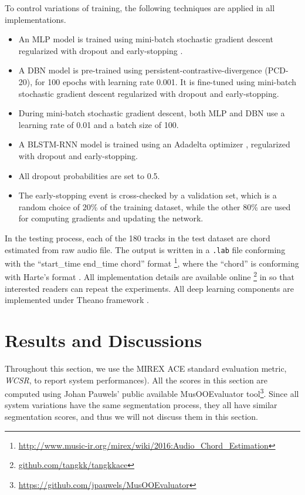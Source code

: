 To control variations of training, the following techniques are applied in all implementations. 
\begin{itemize}
\item An MLP model is trained using mini-batch stochastic gradient descent regularized with dropout \cite{srivastava2014dropout} and early-stopping \cite{prechelt1998automatic}. 
\item A DBN model is pre-trained using persistent-contrastive-divergence \cite{tieleman2008training} (PCD-20), for 100 epochs with learning rate 0.001. It is fine-tuned using mini-batch stochastic gradient descent regularized with dropout and early-stopping.
\item During mini-batch stochastic gradient descent, both MLP and DBN use a learning rate of 0.01 and a batch size of 100. 
\item A BLSTM-RNN model is trained using an Adadelta optimizer \cite{zeiler2012adadelta}, regularized with dropout and early-stopping. 
\item All dropout probabilities are set to 0.5. 
\item The early-stopping event is cross-checked by a validation set, which is a random choice of 20\% of the training dataset, while the other 80\% are used for computing gradients and updating the network.
\end{itemize}

In the testing process, each of the 180 tracks in the test dataset are chord estimated from raw audio file. The output is written in a {\tt .lab} file conforming with the ``start\_time end\_time chord'' format \footnote{\url{http://www.music-ir.org/mirex/wiki/2016:Audio\_Chord\_Estimation}}, where the ``chord'' is conforming with Harte's format \cite{harte2005symbolic}. All implementation details are available online \footnote{\url{github.com/tangkk/tangkkace}} in so that interested readers can repeat the experiments. All deep learning components are implemented under Theano framework \cite{bergstra2010theano}.

\section{Results and Discussions} \label{sec:3-res}

Throughout this section, we use the MIREX ACE standard evaluation metric, \textit{WCSR}, to report system performances). All the scores in this section are computed using Johan Pauwels' public available MusOOEvaluator tool\footnote{\url{https://github.com/jpauwels/MusOOEvaluator}}. Since all system variations have the same segmentation process, they all have similar segmentation scores, and thus we will not discuss them in this section.

